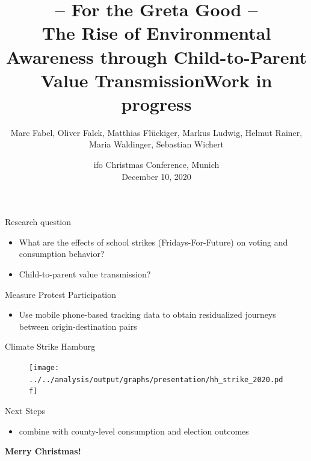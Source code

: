 \documentclass[usenames,dvipsnames]{beamer} %
\title[Soccer and Crime]{  \textbf{-- For the Greta Good -- \\ The Rise of Environmental Awareness through Child-to-Parent Value Transmission}\newline Work in progress}
\author[Marc Fabel]{Marc Fabel, Oliver Falck, Matthias Flückiger, Markus Ludwig, Helmut Rainer, Maria Waldinger, Sebastian Wichert}
\date{ifo Christmas Conference, Munich\\December 10, 2020}
\begin{document}
\begin{frame}
	\titlepage
\end{frame}








\begin{frame}
	\begin{block}{Research question}
		\begin{itemize}
			\item What are the effects of school strikes (Fridays-For-Future) on voting and consumption behavior?
			\item Child-to-parent value transmission?
		\end{itemize}
	\end{block}

	\begin{block}{Measure Protest Participation}
		\begin{itemize}
			\item Use mobile phone-based tracking data to obtain residualized journeys between origin-destination pairs  		
		\end{itemize}
	\end{block}	
\end{frame}





\begin{frame}{Climate Strike Hamburg}
	\begin{figure}
		\texttt{[image: ../../analysis/output/graphs/presentation/hh\_strike\_2020.pdf]}
	\end{figure}
\end{frame}


\begin{frame}
	\begin{block}{Next Steps}
		\begin{itemize}
			\item combine with county-level consumption and election outcomes\pause
		\end{itemize}
	\end{block}

	\begin{center}
		\textbf{Merry Christmas!}
	\end{center}

\end{frame}
\end{document}
